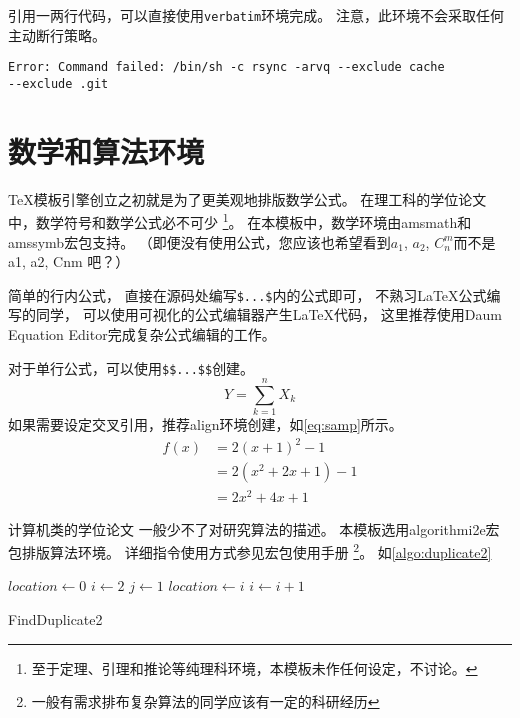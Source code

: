 引用一两行代码，可以直接使用\texttt{verbatim}环境完成。
注意，此环境不会采取任何主动断行策略。
\begin{verbatim}
Error: Command failed: /bin/sh -c rsync -arvq --exclude cache
--exclude .git 
\end{verbatim}

\section{数学和算法环境}

\TeX 模板引擎创立之初就是为了更美观地排版数学公式。
在理工科的学位论文中，数学符号和数学公式必不可少
\footnote{至于定理、引理和推论等纯理科环境，本模板未作任何设定，不讨论。}。
在本模板中，数学环境由amsmath和amssymb宏包支持。
（即便没有使用公式，您应该也希望看到$a_1$, $a_2$, $C_n^m$而不是a1, a2, Cnm 吧？）

简单的行内公式，
直接在源码处编写\texttt{\$...\$}内的公式即可，
不熟习\LaTeX 公式编写的同学，
可以使用可视化的公式编辑器产生\LaTeX 代码，
这里推荐使用Daum Equation Editor完成复杂公式编辑的工作。

对于单行公式，可以使用\texttt{\$\$...\$\$}创建。
$$Y=\sum_{k=1}^n X_k$$
如果需要设定交叉引用，推荐align环境创建，如\eqref{eq:samp}所示。
\begin{align}\label{eq:samp}
    f(x) & = 2(x + 1)^{2} - 1\\                  %
		 & = 2(x^{2} + 2x +1)-1\\
		 & = 2x^{2} + 4x + 1
\end{align}


计算机类的学位论文
一般少不了对研究算法的描述。
本模板选用algorithmi2e宏包排版算法环境。
详细指令使用方式参见宏包使用手册
\footnote{一般有需求排布复杂算法的同学应该有一定的科研经历}。
如\autoref{algo:duplicate2}

\begin{algorithm}
\DontPrintSemicolon
{}
$location \gets 0$\;
$i \gets 2$\;
 {
  $j \gets 1$\;
   {
     {
      $location \gets i$\;
    }
  }
  $i \gets i + 1$\;
}
\;
\caption{{\sc FindDuplicate2}}
\label{algo:duplicate2}
\end{algorithm}


